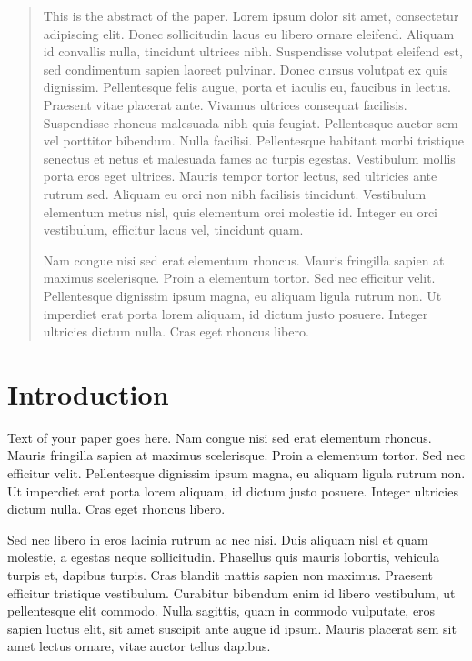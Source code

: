 \documentclass{jgaa-art}
\begin{document}
\begin{abstract}
This is the abstract of the paper.  Lorem ipsum dolor sit amet, consectetur adipiscing elit. Donec sollicitudin lacus eu libero ornare eleifend. Aliquam id convallis nulla, tincidunt ultrices nibh. Suspendisse volutpat eleifend est, sed condimentum sapien laoreet pulvinar. Donec cursus volutpat ex quis dignissim. Pellentesque felis augue, porta et iaculis eu, faucibus in lectus. Praesent vitae placerat ante. Vivamus ultrices consequat facilisis. Suspendisse rhoncus malesuada nibh quis feugiat. Pellentesque auctor sem vel porttitor bibendum. Nulla facilisi. Pellentesque habitant morbi tristique senectus et netus et malesuada fames ac turpis egestas. Vestibulum mollis porta eros eget ultrices. Mauris tempor tortor lectus, sed ultricies ante rutrum sed. Aliquam eu orci non nibh facilisis tincidunt. Vestibulum elementum metus nisl, quis elementum orci molestie id. Integer eu orci vestibulum, efficitur lacus vel, tincidunt quam.

Nam congue nisi sed erat elementum rhoncus. Mauris fringilla sapien at maximus scelerisque. Proin a elementum tortor. Sed nec efficitur velit. Pellentesque dignissim ipsum magna, eu aliquam ligula rutrum non. Ut imperdiet erat porta lorem aliquam, id dictum justo posuere. Integer ultricies dictum nulla. Cras eget rhoncus libero. 
\end{abstract}


\section{Introduction}\label{se:intro}

Text of your paper goes here.  Nam congue nisi sed erat elementum rhoncus. Mauris fringilla sapien at maximus scelerisque. Proin a elementum tortor. Sed nec efficitur velit. Pellentesque dignissim ipsum magna, eu aliquam ligula rutrum non. Ut imperdiet erat porta lorem aliquam, id dictum justo posuere. Integer ultricies dictum nulla. Cras eget rhoncus libero.

Sed nec libero in eros lacinia rutrum ac nec nisi. Duis aliquam nisl et quam molestie, a egestas neque sollicitudin. Phasellus quis mauris lobortis, vehicula turpis et, dapibus turpis. Cras blandit mattis sapien non maximus. Praesent efficitur tristique vestibulum. Curabitur bibendum enim id libero vestibulum, ut pellentesque elit commodo. Nulla sagittis, quam in commodo vulputate, eros sapien luctus elit, sit amet suscipit ante augue id ipsum. Mauris placerat sem sit amet lectus ornare, vitae auctor tellus dapibus.
\end{document}
